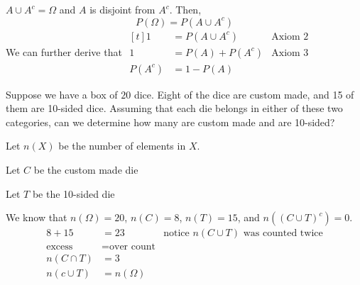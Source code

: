\begin{proposition}
    $A \cup A^c = \Omega$ and $A$ is disjoint from $A^c$. Then, $$P(\Omega) = P(A \cup A^c)$$
    We can further derive that $\begin{aligned}[t]
            1      & = P(A \cup A^c) & \text{Axiom 2} \\
            1      & = P(A) + P(A^c) & \text{Axiom 3} \\
            P(A^c) & = 1 - P(A)
        \end{aligned}$
\end{proposition}

\begin{example}
    Suppose we have a box of $20$ dice. Eight of the dice are custom made, and 15 of them are 10-sided dice. Assuming that each die belongs in either of these two categories, can we determine how many are custom made and are 10-sided?

    Let $n(X)$ be the number of elements in $X$.

    Let $C$ be the custom made die

    Let $T$ be the 10-sided die

    We know that $n(\Omega) = 20$, $n(C) = 8$, $n(T) = 15$, and $n((C \cup T)^c) = 0$.
    \begin{align*}
        8 + 15        & = 23                & \text{notice } n(C \cup T) \text{ was counted twice} \\
        \text{excess} & = \text{over count}                                                        \\
        n(C \cap T)   & = 3                                                                        \\
        n(c \cup T)   & = n(\Omega)
    \end{align*}
\end{example}

